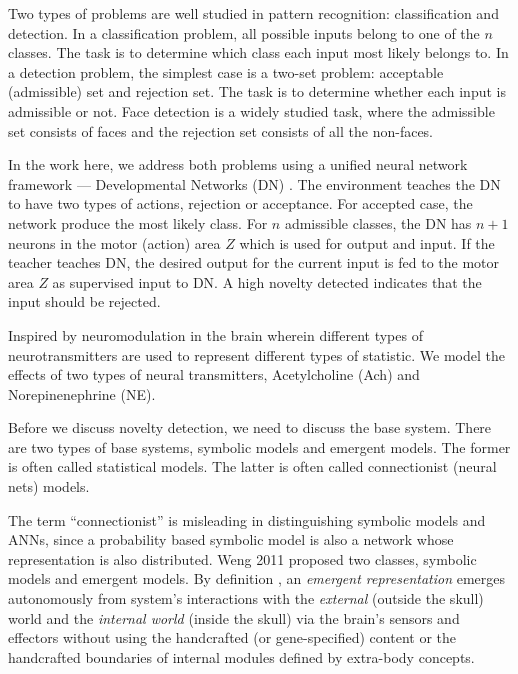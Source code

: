 \documentclass[conference]{IEEEtran}
\begin{document}
Two types of problems are well studied in pattern recognition: classification and detection.   
In a classification problem, all possible inputs belong to one of the $n$ classes.   The task is to determine 
which class each input most likely belongs to.   In a detection problem, the simplest case is a two-set
problem: acceptable (admissible) set and rejection set.   The task is to determine whether each input is
admissible or not.   Face detection is a widely studied task, where the admissible set consists of faces and
the rejection set consists of all the non-faces.   

In the work here, we address both problems using a unified neural network framework --- Developmental Networks (DN) \cite{WengNAI12}.    The environment teaches the DN to have two types of actions, 
rejection or acceptance.  For accepted case, the network produce the most likely class.    For $n$ admissible
classes, the DN has $n+1$ neurons in the motor (action) area $Z$ which is used for output and input.
If the teacher teaches DN, the desired output for the current input is fed to the motor area $Z$ as 
supervised input to DN.  A high novelty detected indicates that the input should be rejected. 

Inspired by neuromodulation in the brain wherein different types of
neurotransmitters are used to represent different types of statistic.
We model the effects of two types of neural transmitters, Acetylcholine (Ach) and Norepinenephrine (NE).

Before we discuss novelty detection, we need to discuss the base system.   
There are two types of base systems, symbolic models and emergent models.  
The former is often called statistical models.  The latter is often called connectionist (neural nets) models. 

The term ``connectionist'' is misleading in distinguishing 
symbolic models and ANNs, since a probability based symbolic model is also a network whose representation is also distributed.  Weng 2011 \cite{WengRepRev12} proposed two classes, symbolic models and emergent models.  
By definition \cite{WengRepRev12}, an {\em emergent representation} emerges autonomously from system's  interactions with the {\em external} (outside the skull) world and
the {\em internal world} (inside the skull) via the brain's sensors and
effectors without using the handcrafted (or gene-specified) content or the handcrafted 
boundaries of internal modules defined by extra-body concepts.
\end{document}
